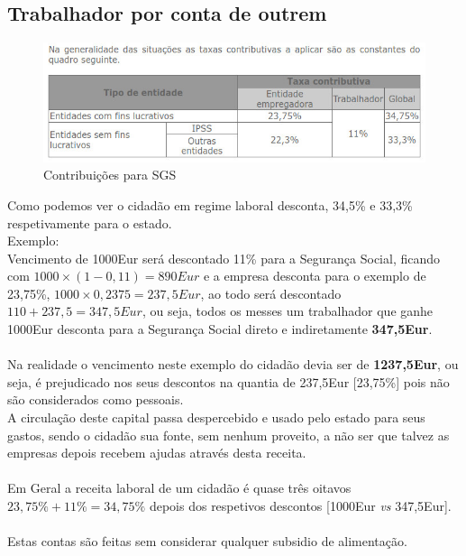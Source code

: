 \subsection{Trabalhador por conta de outrem}
\begin{figure}[H]
\flushleft
\includegraphics[scale=.5]{./image/SGS/Contribuicoes_1.jpg}
\caption{Contribuições para SGS}
\end{figure}\par
\qquad Como podemos ver o cidadão em regime laboral desconta, 34,5\% e 33,3\% respetivamente para o estado.\\
Exemplo:\\ 
Vencimento de 1000Eur será descontado 11\% para a Segurança Social, ficando com $1000\times (1-0,11)=890Eur$ e a empresa desconta para o exemplo de 23,75\%, $1000\times 0,2375=237,5Eur$, ao todo será descontado $110+237,5=347,5Eur$, ou seja, todos os messes um trabalhador que ganhe 1000Eur desconta para a Segurança Social direto e indiretamente \textbf{347,5Eur}.\\ \\
Na realidade o vencimento neste exemplo do cidadão devia ser de \textbf{1237,5Eur}, ou seja, é prejudicado nos seus descontos na quantia de 237,5Eur [23,75\%] pois não são considerados como pessoais.\\
A circulação deste capital passa despercebido e usado pelo estado para seus gastos, sendo o cidadão sua fonte, sem nenhum proveito, a não ser que talvez as empresas depois recebem ajudas através desta receita.\\ \\
Em Geral a receita laboral de um cidadão é quase três oitavos $23,75\%+11\%=34,75\%$ depois dos respetivos descontos [1000Eur \textit{vs} 347,5Eur].\\
\\
Estas contas são feitas sem considerar qualquer subsidio de alimentação.
